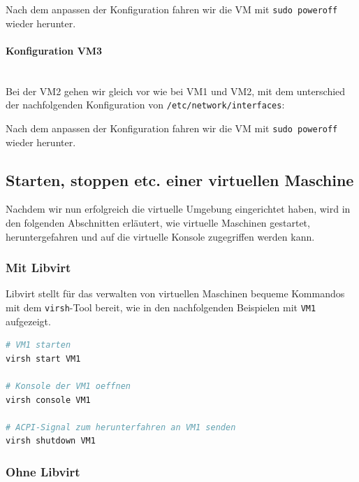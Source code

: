 

Nach dem anpassen der Konfiguration fahren wir die VM mit \lstinline|sudo poweroff| wieder herunter.

\paragraph{Konfiguration VM3} \hfill \\
Bei der VM2 gehen wir gleich vor wie bei VM1 und VM2, mit dem unterschied der nachfolgenden Konfiguration von \lstinline|/etc/network/interfaces|:



Nach dem anpassen der Konfiguration fahren wir die VM mit \lstinline|sudo poweroff| wieder herunter.


\subsection{Starten, stoppen etc. einer virtuellen Maschine}\label{sec:starten-stoppen-etc-einer-virtuellen-maschine}\label{sec:starten-stoppen-etc-einer-virtuellen-maschine}

Nachdem wir nun erfolgreich die virtuelle Umgebung eingerichtet haben, wird in den folgenden Abschnitten erläutert, wie virtuelle Maschinen gestartet, heruntergefahren und auf die virtuelle Konsole zugegriffen werden kann.

\subsubsection{Mit Libvirt}
Libvirt stellt für das verwalten von virtuellen Maschinen bequeme Kommandos mit dem \lstinline|virsh|-Tool bereit, wie in den nachfolgenden Beispielen mit \lstinline|VM1| aufgezeigt.

\begin{lstlisting}[language=bash]
# VM1 starten
virsh start VM1

# Konsole der VM1 oeffnen
virsh console VM1

# ACPI-Signal zum herunterfahren an VM1 senden
virsh shutdown VM1
\end{lstlisting}


\subsubsection{Ohne Libvirt}\label{sec:ohne-libvirt}

